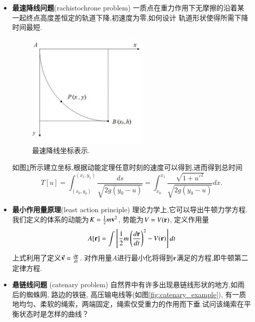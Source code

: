 \begin{itemize}
  \item \textbf{最速降线问题}(rachistochrone problem) 一质点在重力作用下无摩擦的沿着某一起终点高度差恒定的轨道下降,初速度为零,如何设计
  轨道形状使得所需下降时间最短.
  \begin{figure}
    \centering
    \includegraphics[width=0.5\linewidth,height=15em]{fastest_track.png}
    \caption{最速降线坐标表示.}
    \label{fig:rachistochrone}
  \end{figure}
  如图\ref{fig:rachistochrone}所示建立坐标,根据动能定理任意时刻的速度可以得到,进而得到总时间
  \begin{equation}
    T[u] = \int_{(x_0,y_0)}^{(x_1, y_1)} \frac{ds}{\sqrt{2 g(y_0 - u)}} = \int_{x_0}^{x_1} \frac{\sqrt{1+u'^2}}{\sqrt{2 g (y_0 - u)}} dx.
  \end{equation}

  \item \textbf{最小作用量原理}(least action principle) 理论力学上,它可以导出牛顿力学方程.我们定义的体系的动能为$K = {\frac{1}{2}} m {\mathbf{v}}^2$,
  势能为$V = V({\mathbf{r}})$, 定义作用量
  \begin{equation}
    A[{\mathbf{r}}] = \int \left[ {\frac{1}{2}} m \left( \frac{d{\mathbf{r}}}{dt} \right)^2 - V({\mathbf{r}}) \right] dt 
  \end{equation}
  上式利用了定义$\vec{{\mathbf{v}}} = \frac{d{\mathbf{r}}}{dt}$. 对作用量$A$进行最小化将得到${\mathbf{r}}$满足的方程,即牛顿第二定律方程.

  \item \textbf{悬链线问题} (catenary problem) \quad 自然界中有许多出现悬链线形状的地方,如雨后的蜘蛛网, 路边的铁链, 高压输电线等(如图\ref{fig:catenary_example}), 有一质地均匀、柔软的绳索，两端固定，绳索仅受重力的作用而下垂.试问该绳索在平衡状态时是怎样的曲线？
  \begin{figure}
    \centering


\end{figure}
\end{itemize}
